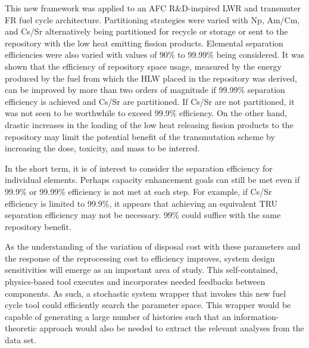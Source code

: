 This new framework was applied to an AFC R\&D-inspired LWR and transmuter 
FR fuel cycle architecture.  Partitioning strategies were varied with 
Np, Am/Cm, and Cs/Sr alternatively being partitioned for recycle or storage 
or sent to the repository with the low heat emitting fission products.
Elemental separation efficiencies were also varied with values of
90\% to 99.99\% being considered.  It was shown that the efficiency 
of repository space usage, measured by the energy produced by the fuel from
which the HLW placed in the repository was derived, can be improved by 
more than two orders of magnitude if 99.99\% separation efficiency is 
achieved and Cs/Sr are partitioned.  If Cs/Sr are not partitioned, it was not seen
to be worthwhile to exceed 99.9\% efficiency.  On the other hand,
drastic increases in the loading of the low heat releasing fission products 
to the repository may limit the potential benefit of the
transmutation scheme by increasing the dose, toxicity, and mass to be
interred.

In the short term, it is of interest to consider the separation
efficiency for individual elements.  Perhaps capacity enhancement goals
can still be met even if 99.9\% or 99.99\% efficiency is not met at each
step.  For example, if Cs/Sr efficiency is limited to 99.9\%, it
appears that achieving an equivalent TRU separation efficiency may not
be necessary. 99\% could suffice with the same repository benefit.  

As the understanding of the variation of disposal cost with
these parameters and the response of the reprocessing cost to
efficiency improves, system design sensitivities will emerge as an important
area of study.  This self-contained, physics-based tool executes and
incorporates needed feedbacks between components.  As such, a stochastic
system wrapper that invokes this new fuel cycle tool could efficiently
search the parameter space.  This wrapper would be capable of generating 
a large number of histories such that an information-theoretic approach 
would also be needed to extract the relevant analyses from the data set.

